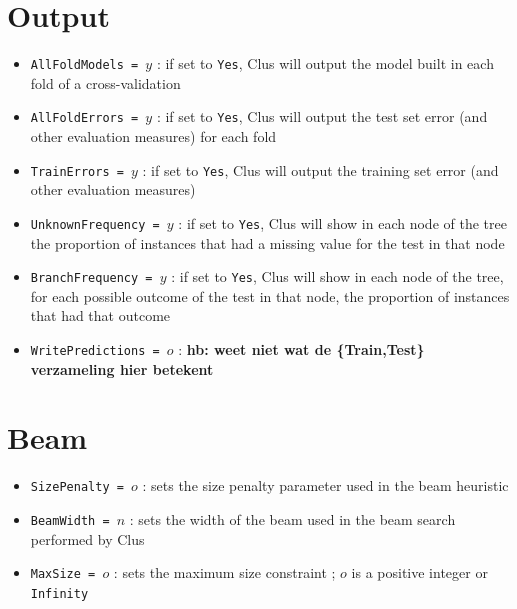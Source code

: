 \documentclass[a4paper]{report}
\begin{document}
\section{Output}

\begin{itemize}
\item {\tt AllFoldModels = $y$} : if set to {\tt Yes}, Clus will output the model built in each fold of a cross-validation
\item {\tt AllFoldErrors = $y$} : if set to {\tt Yes}, Clus will output the test set error (and other evaluation measures) for each fold
\item {\tt TrainErrors = $y$} : if set to {\tt Yes}, Clus will output the training set error (and other evaluation measures)
\item {\tt UnknownFrequency = $y$} : if set to {\tt Yes}, Clus will show in each node of the tree the proportion of instances that had a missing value for the test in that node
\item {\tt BranchFrequency = $y$} : if set to {\tt Yes}, Clus will show in each node of the tree, for each possible outcome of the test in that node, the proportion of instances that had that outcome
\item {\tt WritePredictions = $o$} : {\bf * hb: weet niet wat de \{Train,Test\} verzameling hier betekent}
\end{itemize}

\section{Beam}

\begin{itemize}
\item {\tt SizePenalty = $o$} : sets the size penalty parameter used in the beam heuristic \cite{beam-paper}
\item {\tt BeamWidth = $n$} : sets the width of the beam used in the beam search performed by Clus \cite{beam-paper}
\item {\tt MaxSize = $o$} : sets the maximum size constraint \cite{beam-paper}; $o$ is a positive integer or {\tt Infinity}
\end{itemize}
\end{document}
